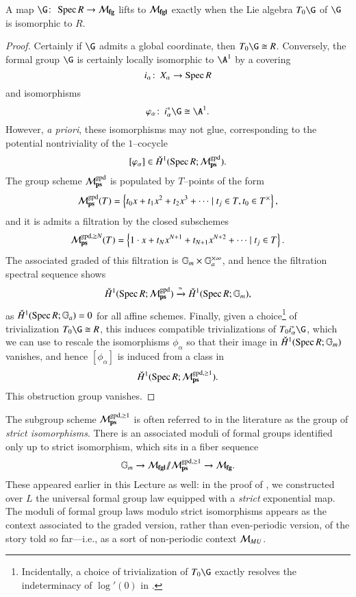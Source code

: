 \begin{lemma}\label{CoordinatizbleFGs}
A map $\G\co \Spec R \to \moduli{fg}$ lifts to $\mathcal{M}_{\mathbf{fgl}}$ exactly when the Lie algebra $T_0 \G$ of $\G$ is isomorphic to $R$.
\end{lemma}
\begin{proof}
Certainly if $\G$ admits a global coordinate, then $T_0 \G \cong R$.  Conversely, the formal group $\G$ is certainly locally isomorphic to $\A^1$ by a covering \[i_\alpha\colon\thinspace X_\alpha \to \operatorname{Spec} R\] and isomorphisms \[\phi_\alpha\co i_\alpha^* \G \cong \A^1.\]  However, \textit{a priori}, these isomorphisms may not glue, corresponding to the potential nontriviality of the {\Cech} $1$--cocycle \[[\varphi_\alpha] \in \check{H}^1(\operatorname{Spec} R; \mathcal{M}_{\mathbf{ps}}^{\mathrm{gpd}}).\]  The group scheme $\mathcal{M}_{\mathbf{ps}}^{\mathrm{gpd}}$ is populated by $T$--points of the form \[\mathcal{M}_{\mathbf{ps}}^{\mathrm{gpd}}(T) = \left\{ t_0 x + t_1 x^2 + t_2 x^3 + \cdots \mid t_j \in T, t_0 \in T^\times \right\},\] and it is admits a filtration by the closed subschemes \[\mathcal{M}_{\mathbf{ps}}^{\mathrm{gpd}, \ge N}(T) = \left\{ 1 \cdot x + t_N x^{N+1} + t_{N+1} x^{N+2} + \cdots \mid t_j \in T \right\}.\]  The associated graded of this filtration is $\mathbb G_m \times \mathbb G_a^{\times \infty}$, and hence the filtration spectral sequence shows \[\check{H}^1(\operatorname{Spec} R; \mathcal{M}_{\mathbf{ps}}^{\mathrm{gpd}}) \xrightarrow{\simeq} \check{H}^1(\operatorname{Spec} R; \mathbb G_m),\] as $\check{H}^1(\operatorname{Spec} R; \mathbb G_a) = 0$ for all affine schemes.  Finally, given a choice\footnote{Incidentally, a choice of trivialization of $T_0 \G$ exactly resolves the indeterminacy of $\log'(0)$ in .} of trivialization $T_0 \G \cong R$, this induces compatible trivializations of $T_0 i_\alpha^* \G$, which we can use to rescale the isomorphisms $\phi_\alpha$ so that their image in $\check{H}^1(\operatorname{Spec} R; \mathbb G_m)$ vanishes, and hence $[\phi_\alpha]$ is induced from a class in \[\check{H}^1(\operatorname{Spec} R; \mathcal{M}_{\mathbf{ps}}^{\mathrm{gpd}, \ge 1}).\]  This obstruction group vanishes.
\end{proof}

\begin{remark}\label{StrictIsosRemark}
The subgroup scheme $\mathcal{M}_{\mathbf{ps}}^{\mathrm{gpd}, \ge 1}$ is often referred to in the literature as the group of \textit{strict isomorphisms}.  There is an associated moduli of formal groups identified only up to strict isomorphism, which sits in a fiber sequence \[\mathbb G_m \to \mathcal{M}_{\mathbf{fgl}} /\!\!/ \mathcal{M}_{\mathbf{ps}}^{\mathrm{gpd}, \ge 1} \to \mathcal{M}_{\mathbf{fg}}.\]  These appeared earlier in this Lecture as well: in the proof of , we constructed over $L$ the universal formal group law equipped with a \emph{strict} exponential map.  The moduli of formal group laws modulo strict isomorphisms appears as the context associated to the graded version, rather than even-periodic version, of the story told so far---i.e., as a sort of non-periodic context $\mathcal{M}_{MU}$.
\end{remark}











